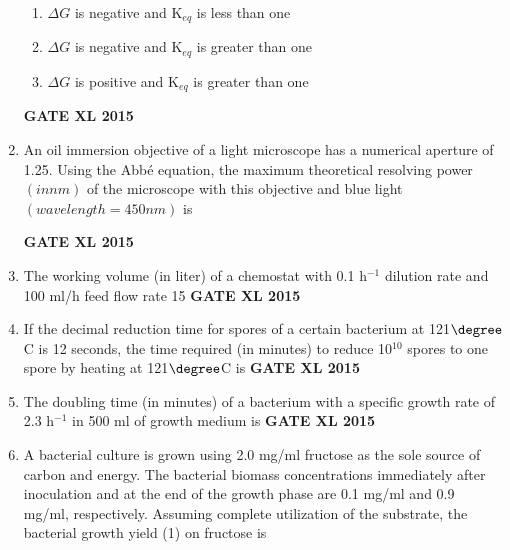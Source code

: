 \documentclass[journal,12pt,onecolumn]{IEEEtran}
\begin{document}
\begin{enumerate}
\begin{enumerate}
	    \item $\Delta G$ is negative and K$_{eq}$ is less than one
	    \item $\Delta G$ is negative and K$_{eq}$ is greater than one
            \item $\Delta G$ is positive and K$_{eq}$ is greater than one
    \end{enumerate}
\hfill{\textbf{GATE XL 2015}}
\item An oil immersion objective of a light microscope has a numerical aperture of 1.25. Using the Abbé equation, the maximum theoretical resolving power $(in nm)$ of the microscope with this objective and blue light $(wavelength=450 nm)$ is

\hfill{\textbf{GATE XL 2015}}
\item The working volume (in liter) of a chemostat with 0.1 h$^{-1}$ dilution rate and 100 ml/h feed flow rate 15
\hfill{\textbf{GATE XL 2015}}
\item If the decimal reduction time for spores of a certain bacterium at 121$\degree$C is 12 seconds, the time required (in minutes) to reduce 10$^{10}$ spores to one spore by heating at 121$\degree$C is
\hfill{\textbf{GATE XL 2015}}
\item	The doubling time (in minutes) of a bacterium with a specific growth rate of 2.3 h$^{-1}$ in 500 ml of growth medium is
\hfill{\textbf{GATE XL 2015}}
\item
	A bacterial culture is grown using 2.0 mg/ml fructose as the sole source of carbon and energy. The bacterial biomass concentrations immediately after inoculation and at the end of the growth phase are 0.1 mg/ml and 0.9 mg/ml, respectively. Assuming complete utilization of the substrate, the bacterial growth yield (1) on fructose is 
        

\end{enumerate}
\end{document}
